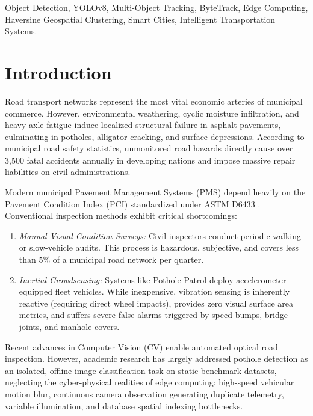 \documentclass[conference]{IEEEtran}
\begin{document}
\begin{IEEEkeywords}
Object Detection, YOLOv8, Multi-Object Tracking, ByteTrack, Edge Computing, Haversine Geospatial Clustering, Smart Cities, Intelligent Transportation Systems.
\end{IEEEkeywords}

\section{Introduction}
Road transport networks represent the most vital economic arteries of municipal commerce. However, environmental weathering, cyclic moisture infiltration, and heavy axle fatigue induce localized structural failure in asphalt pavements, culminating in potholes, alligator cracking, and surface depressions. According to municipal road safety statistics, unmonitored road hazards directly cause over 3,500 fatal accidents annually in developing nations and impose massive repair liabilities on civil administrations.

Modern municipal Pavement Management Systems (PMS) depend heavily on the Pavement Condition Index (PCI) standardized under ASTM D6433 \cite{astm_d6433}. Conventional inspection methods exhibit critical shortcomings:
\begin{enumerate}
    \item \textit{Manual Visual Condition Surveys:} Civil inspectors conduct periodic walking or slow-vehicle audits. This process is hazardous, subjective, and covers less than 5\% of a municipal road network per quarter.
    \item \textit{Inertial Crowdsensing:} Systems like Pothole Patrol \cite{accelerometer_survey} deploy accelerometer-equipped fleet vehicles. While inexpensive, vibration sensing is inherently reactive (requiring direct wheel impacts), provides zero visual surface area metrics, and suffers severe false alarms triggered by speed bumps, bridge joints, and manhole covers.
\end{enumerate}

Recent advances in Computer Vision (CV) enable automated optical road inspection. However, academic research has largely addressed pothole detection as an isolated, offline image classification task on static benchmark datasets, neglecting the cyber-physical realities of edge computing: high-speed vehicular motion blur, continuous camera observation generating duplicate telemetry, variable illumination, and database spatial indexing bottlenecks.
\end{document}
